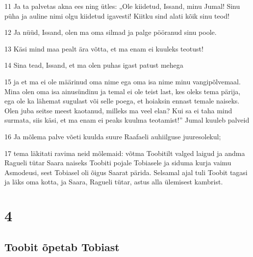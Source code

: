 \par 11 Ja ta palvetas akna ees ning ütles: „Ole kiidetud, Issand, minu  Jumal! Sinu püha ja auline nimi olgu kiidetud igavesti! Kiitku sind  alati kõik sinu teod!
\par 12 Ja nüüd, Issand, olen ma oma silmad ja palge pööranud sinu  poole.
\par 13 Käsi mind maa pealt ära võtta, et ma enam ei kuuleks teotust!
\par 14 Sina tead, Issand, et ma olen puhas igast patust mehega
\par 15 ja et ma ei ole määrinud oma nime ega oma isa nime minu  vangipõlvemaal. Mina olen oma isa ainusündinu ja temal ei ole teist  last, kes oleks tema pärija, ega ole ka lähemat sugulast või selle  poega, et hoiaksin ennast temale naiseks. Olen juba seitse meest  kaotanud, milleks ma veel elan? Kui sa ei taha mind surmata,  siis käsi, et ma enam ei peaks kuulma teotamist!” Jumal kuuleb palveid
\par 16 Ja mõlema palve võeti kuulda suure Raafaeli auhiilguse  juuresolekul;
\par 17 tema läkitati ravima neid mõlemaid: võtma Toobitilt valged laigud  ja andma Ragueli tütar Saara naiseks Toobiti pojale Tobiasele ja  siduma kurja vaimu Asmodeusi, sest Tobiasel oli õigus Saarat pärida.  Selsamal ajal tuli Toobit tagasi ja läks oma kotta, ja Saara, Ragueli  tütar, astus alla ülemisest kambrist.

\chapter{4}

\section*{Toobit õpetab Tobiast}

